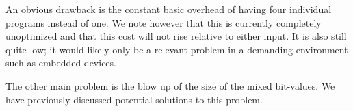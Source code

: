 An obvious drawback is the constant basic overhead of having four
individual programs instead of one. We note however that this is
currently completely unoptimized and that this cost will not rise
relative to either input. It is also still quite low; it would likely only be a relevant problem in a demanding environment
such as embedded devices.

The other main problem is the blow up of the size of the mixed
bit-values. We have previously discussed potential solutions to this
problem.
